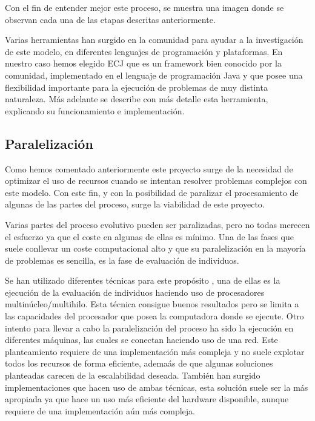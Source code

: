 Con el fin de entender mejor este proceso, se muestra una imagen  donde se observan cada una de las etapas descritas anteriormente.


Varias herramientas han surgido en la comunidad para ayudar a la investigación de este modelo, en diferentes lenguajes de programación y plataformas. En nuestro caso hemos elegido ECJ que es un framework bien conocido por la comunidad, implementado en el lenguaje de programación Java y que posee una flexibilidad importante para la ejecución de problemas de muy distinta naturaleza. M\'as adelante  se describe con m\'as detalle esta herramienta, explicando su funcionamiento e implementación.

\subsection{Paralelizaci\'on\label{analisis-evolutivos-paralelizacion}}

Como hemos comentado anteriormente  este proyecto surge de la necesidad de optimizar el uso de recursos cuando se intentan resolver problemas complejos con este modelo. Con este fin, y con la posibilidad de paralizar el procesamiento de algunas de las partes del proceso, surge la viabilidad de este proyecto.

Varias partes del proceso evolutivo pueden ser paralizadas, pero no todas merecen el esfuerzo ya que el coste en algunas de ellas es mínimo. Una de las fases que suele conllevar un coste computacional alto y que su paralelizaci\'on en la mayoría de problemas es sencilla, es la fase de evaluaci\'on de individuos.

Se han utilizado diferentes técnicas para este prop\'osito \cite{article-parallel-review}\cite{article-paraller-fpga}\cite{Andre:1996:PGP:270195.270224}\cite{DBLP:journals/gpem/VegaTV03}, una de ellas es la ejecución de la evaluación de individuos haciendo uso de procesadores multin\'ucleo/multihilo. Esta t\'ecnica consigue buenos resultados pero se limita a las capacidades del procesador que posea la computadora donde se ejecute. Otro intento para llevar a cabo la paralelizaci\'on del proceso ha sido la ejecución en diferentes m\'aquinas, las cuales se conectan haciendo uso de una red. Este planteamiento requiere de una implementación m\'as compleja y no suele explotar todos los recursos de forma eficiente, adema\'as de que algunas soluciones planteadas carecen de la escalabilidad deseada. Tambi\'en han surgido implementaciones que hacen uso de ambas t\'ecnicas, esta solución suele ser la m\'as apropiada ya que hace un uso m\'as eficiente del hardware disponible, aunque requiere de una implementación a\'un m\'as compleja.

